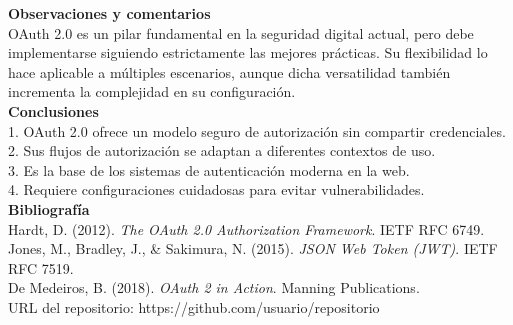 \documentclass[12pt,letterpaper]{article}
\begin{document}
\textbf{Observaciones y comentarios} \\
OAuth 2.0 es un pilar fundamental en la seguridad digital actual, pero debe implementarse siguiendo estrictamente las mejores prácticas. Su flexibilidad lo hace aplicable a múltiples escenarios, aunque dicha versatilidad también incrementa la complejidad en su configuración. \\

\textbf{Conclusiones} \\
1. OAuth 2.0 ofrece un modelo seguro de autorización sin compartir credenciales. \\
2. Sus flujos de autorización se adaptan a diferentes contextos de uso. \\
3. Es la base de los sistemas de autenticación moderna en la web. \\
4. Requiere configuraciones cuidadosas para evitar vulnerabilidades. \\

\textbf{Bibliografía} \\
Hardt, D. (2012). \textit{The OAuth 2.0 Authorization Framework}. IETF RFC 6749. \\
Jones, M., Bradley, J., & Sakimura, N. (2015). \textit{JSON Web Token (JWT)}. IETF RFC 7519. \\
De Medeiros, B. (2018). \textit{OAuth 2 in Action}. Manning Publications. \\

URL del repositorio: https://github.com/usuario/repositorio 
\end{document}
